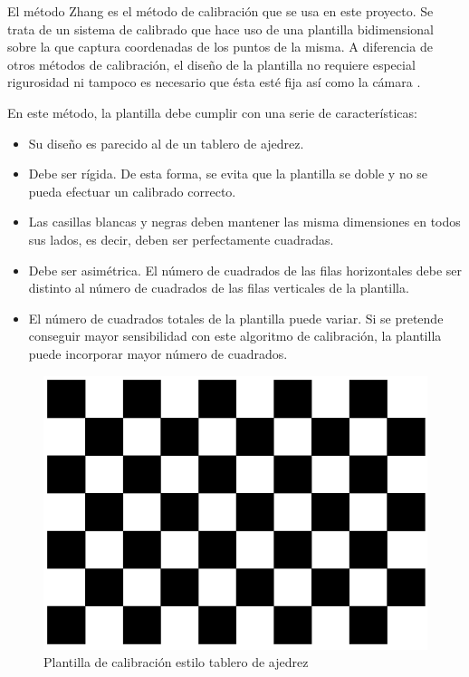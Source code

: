 El método Zhang es el método de calibración que se usa en este proyecto. Se trata de un sistema de calibrado que hace uso de una plantilla bidimensional sobre la que captura coordenadas de los puntos de la misma. A diferencia de otros métodos de calibración, el diseño de la plantilla no requiere especial rigurosidad ni tampoco es necesario que ésta esté fija así como la cámara \citep{viala2008procedimiento}. 

En este método, la plantilla debe cumplir con una serie de características:
\begin{itemize}
    \item Su diseño es parecido al de un tablero de ajedrez. 
    \item Debe ser rígida. De esta forma, se evita que la plantilla se doble y no se pueda efectuar un calibrado correcto.
    \item Las casillas blancas y negras deben mantener las misma dimensiones en todos sus lados, es decir, deben ser perfectamente cuadradas.
    \item Debe ser asimétrica. El número de cuadrados de las filas horizontales debe ser distinto al número de cuadrados de las filas verticales de la plantilla.
    \item El número de cuadrados totales de la plantilla puede variar. Si se pretende conseguir mayor sensibilidad con este algoritmo de calibración, la plantilla puede incorporar mayor número de cuadrados. 
\end{itemize}

\begin{figure}[H]
\centering
\includegraphics[scale = 0.4]{capitulo_02/figuras_dir/CHESSBOARD.jpg}
\caption{Plantilla de calibración estilo tablero de ajedrez}
\end{figure}

